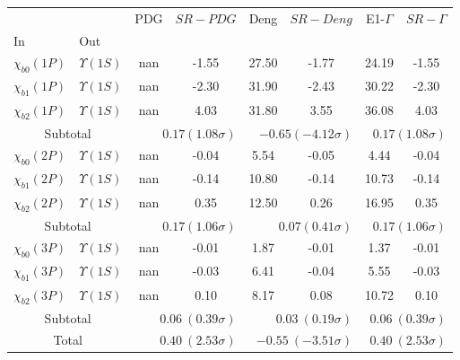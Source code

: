 \begin{tabular}{|l|l|c|c|c|c|c|c|}%
\hline%
&&PDG&$SR-PDG$&Deng&$SR-Deng$&E1-$\Gamma$&$SR-\Gamma$\\%
In&Out&&&&&&\\%
\hline%
$\chi_{b0}(1P)$&$\Upsilon(1S)$&nan&-1.55&27.50&-1.77&24.19&-1.55\\%
$\chi_{b1}(1P)$&$\Upsilon(1S)$&nan&-2.30&31.90&-2.43&30.22&-2.30\\%
$\chi_{b2}(1P)$&$\Upsilon(1S)$&nan&4.03&31.80&3.55&36.08&4.03\\%
\hline%
\hline%
\multicolumn{2}{|c|}{Subtotal}&\multicolumn{2}{|r|}{$0.17 (1.08\sigma)$}&\multicolumn{2}{|r|}{$-0.65 (-4.12\sigma)$}&\multicolumn{2}{|r|}{$0.17 (1.08\sigma)$}\\%
\hline%
\hline%
$\chi_{b0}(2P)$&$\Upsilon(1S)$&nan&-0.04&5.54&-0.05&4.44&-0.04\\%
$\chi_{b1}(2P)$&$\Upsilon(1S)$&nan&-0.14&10.80&-0.14&10.73&-0.14\\%
$\chi_{b2}(2P)$&$\Upsilon(1S)$&nan&0.35&12.50&0.26&16.95&0.35\\%
\hline%
\hline%
\multicolumn{2}{|c|}{Subtotal}&\multicolumn{2}{|r|}{$0.17 (1.06\sigma)$}&\multicolumn{2}{|r|}{$0.07 (0.41\sigma)$}&\multicolumn{2}{|r|}{$0.17 (1.06\sigma)$}\\%
\hline%
\hline%
$\chi_{b0}(3P)$&$\Upsilon(1S)$&nan&-0.01&1.87&-0.01&1.37&-0.01\\%
$\chi_{b1}(3P)$&$\Upsilon(1S)$&nan&-0.03&6.41&-0.04&5.55&-0.03\\%
$\chi_{b2}(3P)$&$\Upsilon(1S)$&nan&0.10&8.17&0.08&10.72&0.10\\%
\hline%
\hline%
\multicolumn{2}{|c|}{Subtotal}&\multicolumn{2}{|r|}{$0.06~(0.39\sigma)$}&\multicolumn{2}{|r|}{$0.03~(0.19\sigma)$}&\multicolumn{2}{|r|}{$0.06~(0.39\sigma)$}\\%
\hline%
\hline%
\multicolumn{2}{|c|}{Total}&\multicolumn{2}{|r|}{$0.40~(2.53\sigma)$}&\multicolumn{2}{|r|}{$-0.55~(-3.51\sigma)$}&\multicolumn{2}{|r|}{$0.40~(2.53\sigma)$}\\%
\hline%
\end{tabular}